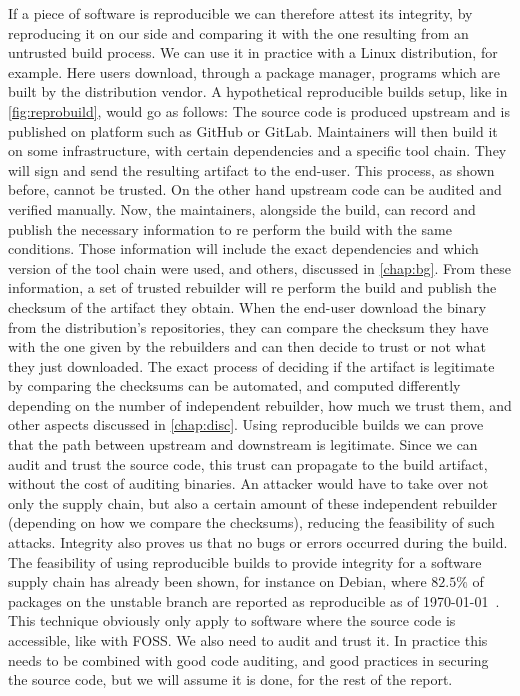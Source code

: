 \documentclass[a4paper,11pt,oneside]{report}
\theoremstyle{definition}
\newcommand{\rb}{reproducible builds\xspace}
\begin{document}
If a piece of software is reproducible we can therefore attest its integrity,
by reproducing it on our side and comparing it with the one resulting from an
untrusted build process. We can use it in practice with a Linux distribution,
for example. Here users download, through a package manager, programs which are
built by the distribution vendor. A hypothetical \rb setup, like in
\autoref{fig:reprobuild}, would go as follows: The source code is produced
upstream and is published on platform such as GitHub or GitLab. Maintainers
will then build it on some infrastructure, with certain dependencies and a
specific tool chain. They will sign and send the resulting artifact to the
end-user. This process, as shown before, cannot be trusted. On the other hand
upstream code can be audited and verified manually. Now, the maintainers,
alongside the build, can record and publish the necessary information to re
perform the build with the same conditions. Those information will include the
exact dependencies and which version of the tool chain were used, and others,
discussed in \autoref{chap:bg}. From these information, a set of trusted
rebuilder will re perform the build and publish the checksum of the artifact
they obtain. When the end-user download the binary from the distribution's
repositories, they can compare the checksum they have with the one given by the
rebuilders and can then decide to trust or not what they just downloaded. The
exact process of deciding if the artifact is legitimate by comparing the
checksums can be automated, and computed differently depending on the number of
independent rebuilder, how much we trust them, and other aspects discussed in
\autoref{chap:disc}. 
Using \rb we can prove that the path between upstream and downstream is
legitimate. Since we can audit and trust the source code, this trust can
propagate to the build artifact, without the cost of auditing binaries. An
attacker would have to take over not only the supply chain, but also a certain
amount of these independent rebuilder (depending on how we compare the
checksums), reducing the feasibility of such attacks. Integrity also proves us
that no bugs or errors occurred during the build. The feasibility of using \rb
to provide integrity for a software supply chain has already been shown, for
instance on Debian, where $82.5\%$ of packages on the unstable branch are
reported as reproducible as of \today~\cite{debian:repro}.
This technique obviously only apply to software where the source code is
accessible, like with FOSS. We also need to audit and trust it. In practice
this needs to be combined with good code auditing, and good practices in
securing the source code, but we will assume it is done, for the rest of the
report.
\end{document}
